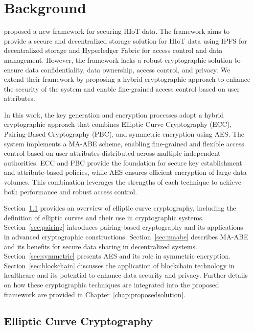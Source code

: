\documentclass[cic,tc,english]{iiufrgs}
\numberwithin{algorithm}{chapter}
\begin{document}
\chapter{Background}
    \label{chap:background}

    \citet{laura2023} proposed a new framework for securing HIoT data. The framework aims to provide a secure and decentralized storage solution for HIoT data using IPFS \cite{benet2013ipfs} for decentralized storage and Hyperledger Fabric \cite{fabric} for access control and data management. However, the framework lacks a robust cryptographic solution to ensure data confidentiality, data ownership, access control, and privacy. We extend their framework by proposing a hybrid cryptographic approach to enhance the security of the system and enable fine-grained access control based on user attributes.

    In this work, the key generation and encryption processes adopt a hybrid cryptographic approach that combines Elliptic Curve Cryptography (ECC), Pairing-Based Cryptography (PBC), and symmetric encryption using AES. The system implements a MA-ABE scheme, enabling fine-grained and flexible access control based on user attributes distributed across multiple independent authorities. ECC and PBC provide the foundation for secure key establishment and attribute-based policies, while AES ensures efficient encryption of large data volumes. This combination leverages the strengths of each technique to achieve both performance and robust access control.



    Section~\ref{sec:ecc} provides an overview of elliptic curve cryptography, including the definition of elliptic curves and their use in cryptographic systems. Section~\ref{sec:pairing} introduces pairing-based cryptography and its applications in advanced cryptographic constructions. Section~\ref{sec:maabe} describes MA-ABE and its benefits for secure data sharing in decentralized systems. Section~\ref{sec:symmetric} presents AES and its role in symmetric encryption. Section~\ref{sec:blockchain} discusses the application of blockchain technology in healthcare and its potential to enhance data security and privacy. Further details on how these cryptographic techniques are integrated into the proposed framework are provided in Chapter~\ref{chap:proposedsolution}.
    

    \section{Elliptic Curve Cryptography}
        \label{sec:ecc}
\end{document}
